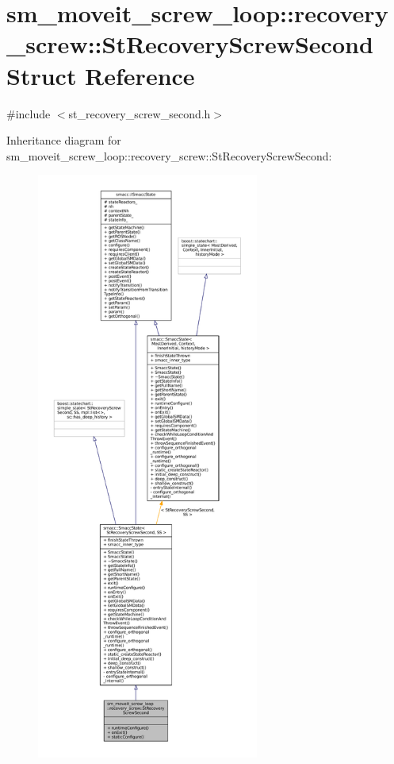 \hypertarget{structsm__moveit__screw__loop_1_1recovery__screw_1_1StRecoveryScrewSecond}{}\section{sm\+\_\+moveit\+\_\+screw\+\_\+loop\+:\+:recovery\+\_\+screw\+:\+:St\+Recovery\+Screw\+Second Struct Reference}
\label{structsm__moveit__screw__loop_1_1recovery__screw_1_1StRecoveryScrewSecond}


{\ttfamily \#include $<$st\+\_\+recovery\+\_\+screw\+\_\+second.\+h$>$}



Inheritance diagram for sm\+\_\+moveit\+\_\+screw\+\_\+loop\+:\+:recovery\+\_\+screw\+:\+:St\+Recovery\+Screw\+Second\+:
\nopagebreak
\begin{figure}[H]
\begin{center}
\leavevmode
\includegraphics[height=550pt]{structsm__moveit__screw__loop_1_1recovery__screw_1_1StRecoveryScrewSecond__inherit__graph}
\end{center}
\end{figure}


